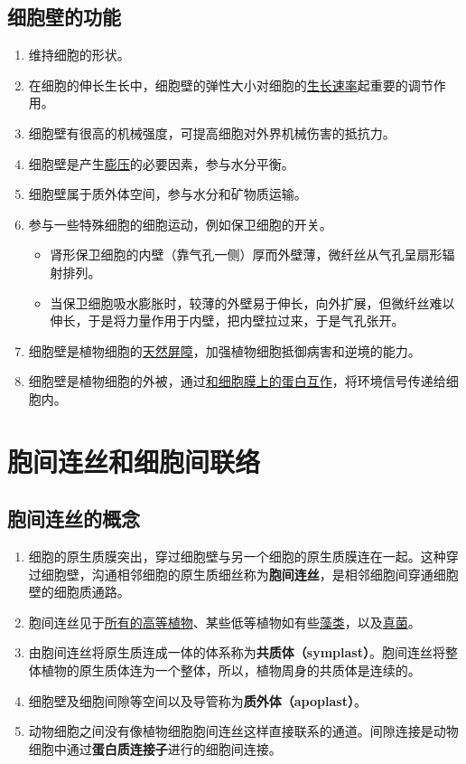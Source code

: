 \subsection{细胞壁的功能}
\begin{enumerate}
    \item 维持细胞的形状。
    \item 在细胞的伸长生长中，细胞壁的弹性大小对细胞的\uline{生长速率}起重要的调节作用。
    \item 细胞壁有很高的机械强度，可提高细胞对外界机械伤害的抵抗力。
    \item 细胞壁是产生\uline{膨压}的必要因素，参与水分平衡。
    \item 细胞壁属于质外体空间，参与水分和矿物质运输。
    \item 参与一些特殊细胞的细胞运动，例如保卫细胞的开关。
    \begin{itemize}
        \item 肾形保卫细胞的内壁（靠气孔一侧）厚而外壁薄，微纤丝从气孔呈扇形辐射排列。
        \item 当保卫细胞吸水膨胀时，较薄的外壁易于伸长，向外扩展，但微纤丝难以伸长，于是将力量作用于内壁，把内壁拉过来，于是气孔张开。
    \end{itemize}
    \item 细胞壁是植物细胞的\uline{天然屏障}，加强植物细胞抵御病害和逆境的能力。
    \item 细胞壁是植物细胞的外被，通过\uline{和细胞膜上的蛋白互作}，将环境信号传递给细胞内。
\end{enumerate}

\section{胞间连丝和细胞间联络}
\subsection{胞间连丝的概念}
\begin{enumerate}
    \item 细胞的原生质膜突出，穿过细胞壁与另一个细胞的原生质膜连在一起。这种穿过细胞壁，沟通相邻细胞的原生质细丝称为\textbf{胞间连丝}，是相邻细胞间穿通细胞壁的细胞质通路。
    \item 胞间连丝见于\uline{所有的高等植物}、某些低等植物如有些\uline{藻类}，以及\uline{真菌}。
    \item 由胞间连丝将原生质连成一体的体系称为\textbf{共质体（symplast）}。胞间连丝将整体植物的原生质体连为一个整体，所以，植物周身的共质体是连续的。
    \item 细胞壁及细胞间隙等空间以及导管称为\textbf{质外体（apoplast）}。
    \item 动物细胞之间没有像植物细胞胞间连丝这样直接联系的通道。间隙连接是动物细胞中通过\textbf{蛋白质连接子}进行的细胞间连接。
\end{enumerate}
